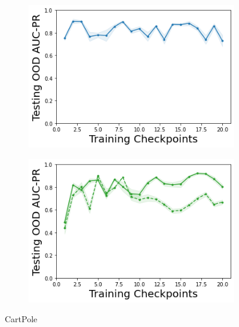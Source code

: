 \begin{figure}
\begin{subfigure}{.24\textwidth}
        \includegraphics[width=\textwidth]{sections/011_icml2022/resources/DKL-CartPoleOOD-v0-AUC-PR-out-epistemic_-testing-strategy.png}
    \end{subfigure}
    \begin{subfigure}{.24\textwidth}
        \includegraphics[width=\textwidth]{sections/011_icml2022/resources/PostNet-CartPoleOOD-v0-AUC-PR-out-epistemic_-testing-strategy.png}
    \end{subfigure}
    \vspace{-3mm}
    \caption*{CartPole}
    \vspace{2mm}
    

\end{figure}
